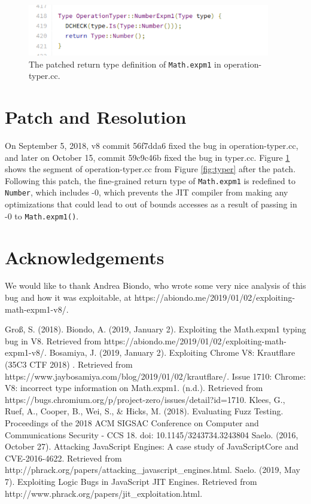 \documentclass[11pt]{article}
\begin{document}
\begin{figure}
	\centering
	\includegraphics[width=300pt]{patch.png}
	\caption{The patched return type definition of \texttt{Math.expm1} in operation-typer.cc.}
  \label{fig:patch}
\end{figure}
\section{Patch and Resolution}
On September 5, 2018, v8 commit 56f7dda6 fixed the bug in operation-typer.cc, and later on October 15, commit 59c9c46b fixed the bug in typer.cc. Figure \ref{fig:patch} shows the segment of operation-typer.cc from Figure \ref{fig:typer} after the patch. Following this patch, the fine-grained return type of \texttt{Math.expm1} is redefined to \texttt{Number}, which includes -0, which prevents the JIT compiler from making any optimizations that could lead to out of bounds accesses as a result of passing in -0 to \texttt{Math.expm1()}.

\section{Acknowledgements} 
We would like to thank Andrea Biondo, who wrote some very nice analysis of this bug and how it was exploitable, at https://abiondo.me/2019/01/02/exploiting-math-expm1-v8/.

\begin{thebibliography}{}
		Groß, S. (2018).
		Biondo, A. (2019, January 2). Exploiting the Math.expm1 typing bug in V8. Retrieved from https://abiondo.me/2019/01/02/exploiting-math-expm1-v8/.
		Bosamiya, J. (2019, January 2). Exploiting Chrome V8: Krautflare (35C3 CTF 2018) . Retrieved from https://www.jaybosamiya.com/blog/2019/01/02/krautflare/.
		Issue 1710: Chrome: V8: incorrect type information on Math.expm1. (n.d.). Retrieved from https://bugs.chromium.org/p/project-zero/issues/detail?id=1710.
		Klees, G., Ruef, A., Cooper, B., Wei, S., \& Hicks, M. (2018). Evaluating Fuzz Testing. Proceedings of the 2018 ACM SIGSAC Conference on Computer and Communications Security - CCS 18. doi: 10.1145/3243734.3243804
		Saelo. (2016, October 27). Attacking JavaScript Engines: A case study of JavaScriptCore and CVE-2016-4622. Retrieved from http://phrack.org/papers/attacking\_javascript\_engines.html.
		Saelo. (2019, May 7). Exploiting Logic Bugs in JavaScript JIT Engines. Retrieved from http://www.phrack.org/papers/jit\_exploitation.html.
\end{thebibliography}
\end{document}
